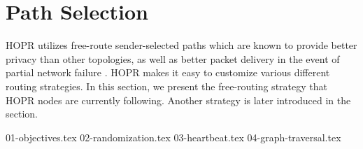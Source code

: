 \section{Path Selection}
\label{sec:path-selection}

HOPR utilizes free-route sender-selected paths which are known to provide better privacy than other topologies, as well as better packet delivery in the event of partial network failure \cite{Dingledine2004SynchronousBF}. HOPR makes it easy to customize various different routing strategies. In this section, we present the free-routing strategy that HOPR nodes are currently following. Another strategy is later introduced in the  section.

{01-objectives.tex}
{02-randomization.tex}
{03-heartbeat.tex}
{04-graph-traversal.tex}